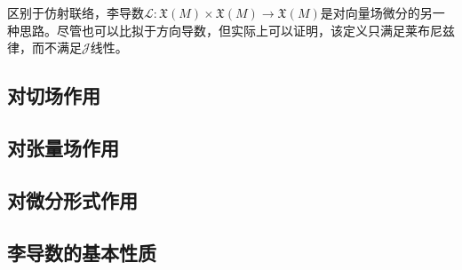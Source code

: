 区别于仿射联络，李导数$\mathcal{L}:\mathfrak{X}(M)\times\mathfrak{X}(M)\to\mathfrak{X}(M)$是对向量场微分的另一种思路。尽管也可以比拟于方向导数，但实际上可以证明，该定义只满足莱布尼兹律，而不满足$\mathcal J$线性。

\subsection{对切场作用}
\subsection{对张量场作用}
\subsection{对微分形式作用}
\subsection{李导数的基本性质}